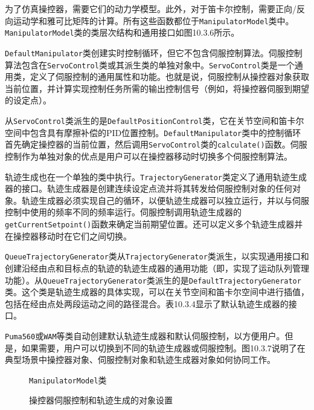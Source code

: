 \documentclass[UTF8,a4paper,12pt]{ctexart}
\begin{document}
为了仿真操控器，需要它们的动力学模型。此外，对于笛卡尔控制，需要正向/反向运动学和雅可比矩阵的计算。所有这些函数都位于\texttt{ManipulatorModel}类中。\texttt{ManipulatorModel}类的类层次结构和通用接口如图10.3.6所示。

\texttt{DefaultManipulator}类创建实时控制循环，但它不包含伺服控制算法。伺服控制算法包含在\texttt{ServoControl}类或其派生类的单独对象中。\texttt{ServoControl}类是一个通用类，定义了伺服控制的通用属性和功能。也就是说，伺服控制从操控器对象获取当前位置，并计算实现控制任务所需的输出控制信号（例如，将操控器伺服到期望的设定点）。

从\texttt{ServoControl}类派生的是\texttt{DefaultPositionControl}类，它在关节空间和笛卡尔空间中包含具有摩擦补偿的PID位置控制。\texttt{DefaultManipulator}类中的控制循环首先确定操控器的当前位置，然后调用\texttt{ServoControl}类的\texttt{calculate()}函数。伺服控制作为单独对象的优点是用户可以在操控器移动时切换多个伺服控制算法。

轨迹生成也在一个单独的类中执行。\texttt{TrajectoryGenerator}类定义了通用轨迹生成器的接口。轨迹生成器是创建连续设定点流并将其转发给伺服控制对象的任何对象。轨迹生成器必须实现自己的循环，以便轨迹生成器可以独立运行，并以与伺服控制中使用的频率不同的频率运行。伺服控制调用轨迹生成器的\texttt{getCurrentSetpoint()}函数来确定当前期望位置。还可以定义多个轨迹生成器并在操控器移动时在它们之间切换。

\texttt{QueueTrajectoryGenerator}类从\texttt{TrajectoryGenerator}类派生，以实现通用接口和创建沿经由点和目标点的轨迹的轨迹生成器的通用功能（即，实现了运动队列管理功能）。从\texttt{QueueTrajectoryGenerator}类派生的是\texttt{DefaultTrajectoryGenerator}类。这个类是轨迹生成器的具体实现，可以在关节空间和笛卡尔空间中进行插值，包括在经由点处两段运动之间的路径混合。表10.3.4显示了默认轨迹生成器的接口。

\texttt{Puma560}或\texttt{WAM}等类自动创建默认轨迹生成器和默认伺服控制，以方便用户。但是，如果需要，用户可以切换到不同的轨迹生成器或伺服控制。图10.3.7说明了在典型场景中操控器对象、伺服控制对象和轨迹生成器对象如何协同工作。

\begin{figure}[htbp]
\centering
{}
\caption{\texttt{ManipulatorModel}类}
\label{fig:10.3.6}
\end{figure}

\begin{figure}[htbp]
\centering
{}
\caption{操控器伺服控制和轨迹生成的对象设置}
\label{fig:10.3.7}
\end{figure}
\end{document}
